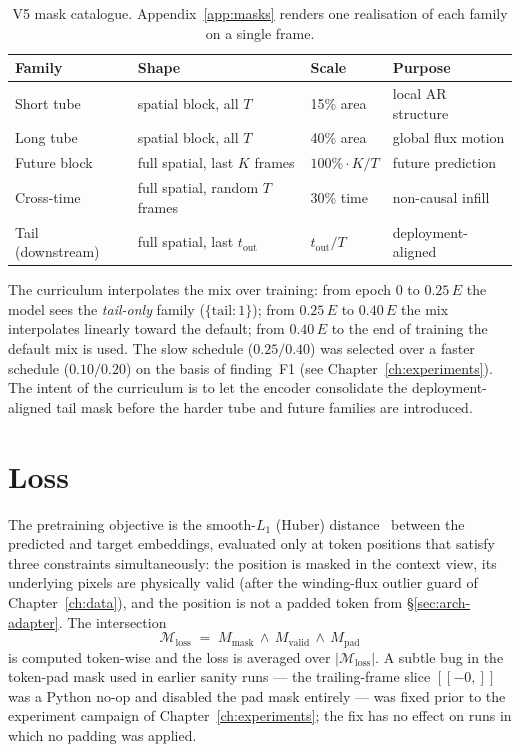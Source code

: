 \begin{table}[htbp]
\centering\small
\begin{tabular}{l l l l}
\toprule
Family & Shape & Scale & Purpose \\
\midrule
Short tube       & spatial block, all $T$           & 15\% area        & local AR structure \\
Long tube        & spatial block, all $T$           & 40\% area        & global flux motion \\
Future block     & full spatial, last $K$ frames    & $100\% \cdot K/T$ & future prediction \\
Cross-time       & full spatial, random $T$ frames  & 30\% time        & non-causal infill \\
Tail (downstream)& full spatial, last $t_{\text{out}}$ & $t_{\text{out}}/T$ & deployment-aligned \\
\bottomrule
\end{tabular}
\caption{V5 mask catalogue. Appendix~\ref{app:masks} renders one
realisation of each family on a single frame.}
\label{tab:masks}
\end{table}

The curriculum interpolates the mix over training: from epoch $0$ to
$0.25\,E$ the model sees the \emph{tail-only} family ($\{\text{tail}:
1\}$); from $0.25\,E$ to $0.40\,E$ the mix interpolates linearly
toward the default; from $0.40\,E$ to the end of training the
default mix is used. The slow schedule
($0.25 / 0.40$) was selected over a faster schedule ($0.10 /
0.20$) on the basis of finding~F1 (see
Chapter~\ref{ch:experiments}). The intent of the curriculum is to
let the encoder consolidate the deployment-aligned tail mask before
the harder tube and future families are introduced.

\section{Loss}
\label{sec:arch-loss}

The pretraining objective is the smooth-$L_{1}$ (Huber)
distance~\cite{girshick2015fastrcnn} between the predicted and
target embeddings, evaluated only at token positions
that satisfy three constraints simultaneously: the position is masked
in the context view, its underlying pixels are physically valid
(after the winding-flux outlier guard of Chapter~\ref{ch:data}),
and the position is not a padded token from
\S\ref{sec:arch-adapter}. The intersection
\begin{equation}
\mathcal{M}_{\text{loss}} \;=\; M_{\text{mask}}
\,\wedge\, M_{\text{valid}}
\,\wedge\, M_{\text{pad}}
\label{eq:lossmask}
\end{equation}
is computed token-wise and the loss is averaged over $|\mathcal{M}_{\text{loss}}|$.
A subtle bug in the token-pad mask used in earlier sanity runs ---
the trailing-frame slice $[\![-0,]\!]$ was a Python no-op and
disabled the pad mask entirely --- was fixed prior to the experiment
campaign of Chapter~\ref{ch:experiments}; the fix has no effect on
runs in which no padding was applied.


